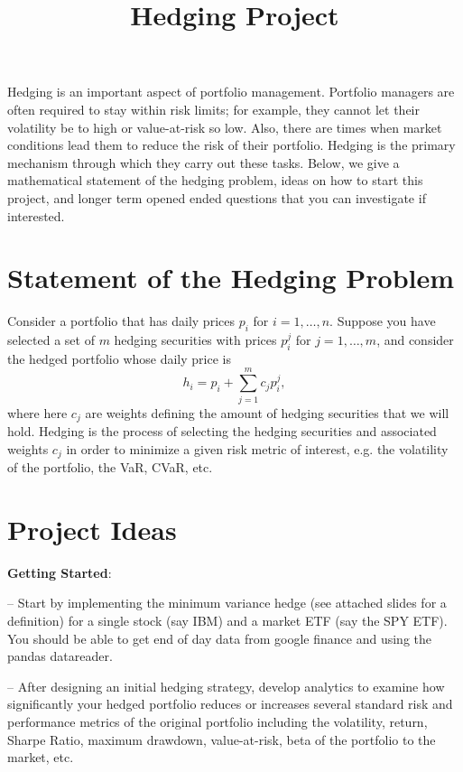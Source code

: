 \documentclass{amsart}
\title{Hedging Project}
\begin{document}
\maketitle

Hedging is an important aspect of portfolio management.  Portfolio 
managers are often required to stay within risk limits; for example, they cannot 
let their volatility be to high or value-at-risk so low.  Also, there are times 
when market conditions lead them to reduce the risk of their portfolio.  
Hedging is the primary mechanism through which they carry out these tasks.  
Below, we give a mathematical statement of the hedging problem, ideas on how 
to start this project, and longer term opened ended questions that you 
can investigate if interested.

\section{Statement of the Hedging Problem}
%
Consider a portfolio that has daily prices $p_i$ for $i=1,\ldots,n$. Suppose you have 
selected a set of $m$ hedging securities with prices $p^j_i$ for $j=1,\ldots,m$, 
and consider the hedged portfolio whose daily price is 
%
\begin{equation}
    h_i = p_i + \sum_{j=1}^m c_j p^j_i,
\end{equation}
%
where here $c_j$ are weights defining the amount of hedging securities that 
we will hold.  Hedging is the process of selecting the hedging securities 
and associated weights $c_j$ in order to minimize a given risk metric of interest, 
e.g. the volatility of the portfolio, the VaR, CVaR, etc.

\section{Project Ideas}
\textbf{Getting Started}:

-- Start by implementing the minimum variance hedge (see attached slides for a 
definition) for a single stock (say IBM) and a market ETF (say the SPY ETF).  You 
should be able to get end of day data from google finance and using the pandas 
datareader. 

-- After designing an initial hedging strategy, develop analytics to examine how 
   significantly your hedged portfolio reduces or increases several standard
   risk and performance metrics of the original portfolio including the 
   volatility, return, Sharpe Ratio, maximum drawdown, value-at-risk, 
   beta of the portfolio to the market, etc.
\end{document}
